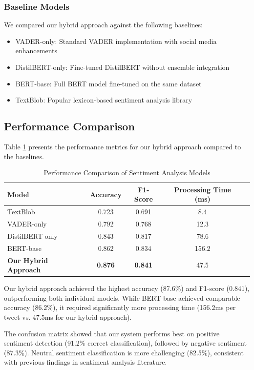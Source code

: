 \documentclass[conference]{IEEEtran}
\begin{document}
\subsubsection{Baseline Models}
We compared our hybrid approach against the following baselines:
\begin{itemize}
    \item VADER-only: Standard VADER implementation with social media enhancements
    \item DistilBERT-only: Fine-tuned DistilBERT without ensemble integration
    \item BERT-base: Full BERT model fine-tuned on the same dataset
    \item TextBlob: Popular lexicon-based sentiment analysis library
\end{itemize}

\subsection{Performance Comparison}

Table \ref{tab:performance} presents the performance metrics for our hybrid approach compared to the baselines.

\begin{table}[!t]
\caption{Performance Comparison of Sentiment Analysis Models}
\label{tab:performance}
\centering
\begin{tabular}{lcccc}
\toprule
\textbf{Model} & \textbf{Accuracy} & \textbf{F1-Score} & \textbf{Processing Time (ms)} \\
\midrule
TextBlob & 0.723 & 0.691 & 8.4 \\
VADER-only & 0.792 & 0.768 & 12.3 \\
DistilBERT-only & 0.843 & 0.817 & 78.6 \\
BERT-base & 0.862 & 0.834 & 156.2 \\
\textbf{Our Hybrid Approach} & \textbf{0.876} & \textbf{0.841} & 47.5 \\
\bottomrule
\end{tabular}
\end{table}

Our hybrid approach achieved the highest accuracy (87.6\%) and F1-score (0.841), outperforming both individual models. While BERT-base achieved comparable accuracy (86.2\%), it required significantly more processing time (156.2ms per tweet vs. 47.5ms for our hybrid approach).

The confusion matrix showed that our system performs best on positive sentiment detection (91.2\% correct classification), followed by negative sentiment (87.3\%). Neutral sentiment classification is more challenging (82.5\%), consistent with previous findings in sentiment analysis literature.
\end{document}

